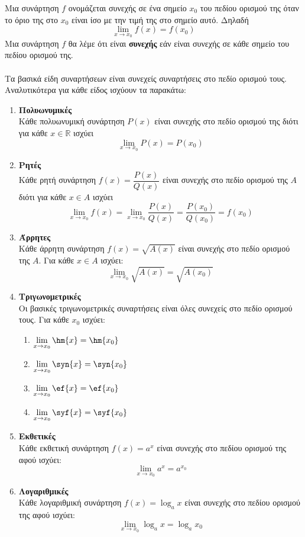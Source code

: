 \documentclass[twoside,nofonts,ektypwsh,math,spyros]{frontisthrio}
\begin{document}
\orismoi
{}
Μια συνάρτηση $ f $ ονομάζεται συνεχής σε ένα σημείο $ x_0 $ του πεδίου ορισμού της όταν το όριο της στο $ x_0 $ είναι ίσο με την τιμή της στο σημείο αυτό. Δηλαδή \[ \lim_{x\rightarrow x_0}{f(x)}=f(x_0) \]
Μια συνάρτηση $ f $ θα λέμε ότι είναι \textbf{συνεχής} εάν είναι συνεχής σε κάθε σημείο του πεδίου ορισμού της.\\\\
\thewrhmata
{}
Τα βασικά είδη συναρτήσεων είναι συνεχείς συναρτήσεις στο πεδίο ορισμού τους. Αναλυτικότερα για κάθε είδος ισχύουν τα παρακάτω:
\begin{enumerate}[label=\bf\arabic*.]
\item \textbf{Πολυωνυμικές}\\
Κάθε πολυωνυμική συνάρτηση $ P(x) $ είναι συνεχής στο πεδίο ορισμού της διότι για κάθε $ x\in\mathbb{R} $ ισχύει \[ \lim_{x\rightarrow x_0}{P(x)}=P(x_0) \]
\item \textbf{Ρητές}\\
Κάθε ρητή συνάρτηση $ f(x)=\dfrac{P(x)}{Q(x)} $ είναι συνεχής στο πεδίο ορισμού της $ A $ διότι για κάθε $ x\in A $ ισχύει \[ \lim_{x\rightarrow x_0}{f(x)}=\lim_{x\rightarrow x_0}{\dfrac{P(x)}{Q(x)}}=\dfrac{P(x_0)}{Q(x_0)}=f(x_0) \]
\item \textbf{Άρρητες}\\
Κάθε άρρητη συνάρτηση $ f(x)=\sqrt{A(x)} $ είναι συνεχής στο πεδίο ορισμού της $ A $. Για κάθε $ x\in A $ ισχύει:
\[ \lim_{x\rightarrow x_0}{\sqrt{A(x)}}=\sqrt{A(x_0)} \] 
\item \textbf{Τριγωνομετρικές}\\
Οι βασικές τριγωνομετρικές συναρτήσεις είναι όλες συνεχείς στο πεδίο ορισμού τους. Για κάθε $ x_0 $ ισχύει:
\begin{multicols}{2}
\begin{enumerate}[label=\roman*.]
\item $ \displaystyle{\lim_{x\rightarrow x_0}{\hm{x}}=\hm{x_0}} $
\item $ \displaystyle{\lim_{x\rightarrow x_0}{\syn{x}}=\syn{x_0}} $
\item $ \displaystyle{\lim_{x\rightarrow x_0}{\ef{x}}=\ef{x_0}} $
\item $ \displaystyle{\lim_{x\rightarrow x_0}{\syf{x}}=\syf{x_0}} $
\end{enumerate}
\end{multicols}
\item \textbf{Εκθετικές}\\
Κάθε εκθετική συνάρτηση $ f(x)=a^x $ είναι συνεχής στο πεδίου ορισμού της αφού ισχύει:
\[ \lim_{x\to x_0}{a^x}=a^{x_0} \]
\item \textbf{Λογαριθμικές}\\
Κάθε λογαριθμική συνάρτηση $ f(x)=\log_{a}{x} $ είναι συνεχής στο πεδίου ορισμού της αφού ισχύει:
\[ \lim_{x\to x_0}{\log_{a}{x}}=\log_{a}{x_0} \]
\end{enumerate}
\end{document}
